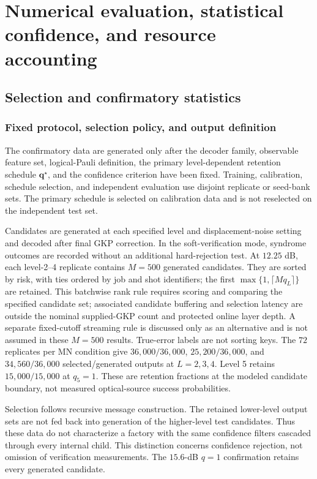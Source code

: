 \documentclass[aps,
prx,
superscriptaddress,
reprint,
longbibliography,
floatfix]{revtex4-2}
\newcounter{criterion}[section]
\begin{document}
\section{Numerical evaluation, statistical confidence, and resource accounting}\label{app:numerical_resource_protocol}
\subsection{Selection and confirmatory statistics}\label{app:statistics}
\subsubsection{Fixed protocol, selection policy, and output definition}\label{app:selection_policy}
The confirmatory data are generated only after the decoder family, observable feature set, logical-Pauli definition, the primary level-dependent retention schedule $\mathbf q^{\star}$, and the confidence criterion have been fixed. Training, calibration, schedule selection, and independent evaluation use disjoint replicate or seed-bank sets. The primary schedule is selected on calibration data and is not reselected on the independent test set.

Candidates are generated at each specified level and displacement-noise setting and decoded after final GKP correction. In the soft-verification mode, syndrome outcomes are recorded without an additional hard-rejection test. At $12.25$ dB, each level-2--4 replicate contains $M=500$ generated candidates. They are sorted by risk, with ties ordered by job and shot identifiers; the first $\max\{1,\lceil Mq_L\rceil\}$ are retained. This batchwise rank rule requires scoring and comparing the specified candidate set; associated candidate buffering and selection latency are outside the nominal supplied-GKP count and protected online layer depth. A separate fixed-cutoff streaming rule is discussed only as an alternative and is not assumed in these $M=500$ results. True-error labels are not sorting keys. The $72$ replicates per MN condition give $36{,}000/36{,}000$, $25{,}200/36{,}000$, and $34{,}560/36{,}000$ selected/generated outputs at $L=2,3,4$. Level 5 retains $15{,}000/15{,}000$ at $q_5=1$. These are retention fractions at the modeled candidate boundary, not measured optical-source success probabilities.

Selection follows recursive message construction. The retained lower-level output sets are not fed back into generation of the higher-level test candidates. Thus these data do not characterize a factory with the same confidence filters cascaded through every internal child. This distinction concerns confidence rejection, not omission of verification measurements. The $15.6$-dB $q=1$ confirmation retains every generated candidate.
\end{document}
